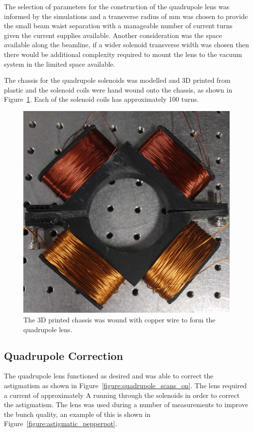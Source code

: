The selection of parameters for the construction of the quadrupole lens was informed by the simulations and a transverse radius of \unit[35]{mm} was chosen to provide the small beam waist separation with a manageable number of current turns given the current supplies available.
Another consideration was the space available along the beamline, if a wider solenoid transverse width was chosen then there would be additional complexity required to mount the lens to the vacuum system in the limited space available.

The chassis for the quadrupole solenoids was modelled and 3D printed from plastic and the solenoid coils were hand wound onto the chassis, as shown in Figure~\ref{figure:quadrupole}.
Each of the solenoid coils has approximately 100 turns.

\begin{figure}
    \centering
    \includegraphics[width=0.5\linewidth]{part2/Figs/quadrupole.jpg}
    \caption[3D printed quadrupole lens.]{The 3D printed chassis was wound with copper wire to form the quadrupole lens.}
    \label{figure:quadrupole}
\end{figure}

\subsection{Quadrupole Correction}

The quadrupole lens functioned as desired and was able to correct the astigmatism as shown in Figure~\ref{figure:quadrupole_scans_on}.
The lens required a current of approximately \unit[1]{A} running through the solenoids in order to correct the astigmatism.
The lens was used during a number of measurements to improve the bunch quality, an example of this is shown in Figure~\ref{figure:astigmatic_pepperpot}. 

